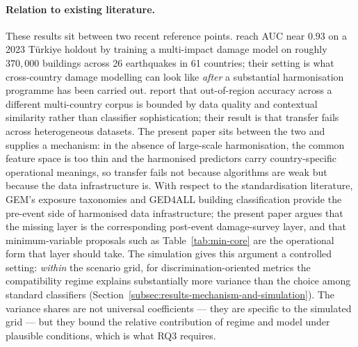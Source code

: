 \documentclass[11pt,a4paper]{article}
\begin{document}
\paragraph{Relation to existing literature.} These results sit between two recent reference points. \citet{patten2024datadriven} reach AUC near $0.93$ on a 2023 T\"urkiye holdout by training a multi-impact damage model on roughly $370{,}000$ buildings across 26 earthquakes in 61 countries; their setting is what cross-country damage modelling can look like \emph{after} a substantial harmonisation programme has been carried out. \citet{ghimire2024host} report that out-of-region accuracy across a different multi-country corpus is bounded by data quality and contextual similarity rather than classifier sophistication; their result is that transfer fails across heterogeneous datasets. The present paper sits between the two and supplies a mechanism: in the absence of large-scale harmonisation, the common feature space is too thin and the harmonised predictors carry country-specific operational meanings, so transfer fails not because algorithms are weak but because the data infrastructure is. With respect to the standardisation literature, GEM's exposure taxonomies and GED4ALL building classification \citep{silva2022buildingclass, yepes2023exposure} provide the pre-event side of harmonised data infrastructure; the present paper argues that the missing layer is the corresponding post-event damage-survey layer, and that minimum-variable proposals such as Table~\ref{tab:min-core} are the operational form that layer should take. The simulation gives this argument a controlled setting: \emph{within} the scenario grid, for discrimination-oriented metrics the compatibility regime explains substantially more variance than the choice among standard classifiers (Section~\ref{subsec:results-mechanism-and-simulation}). The variance shares are not universal coefficients --- they are specific to the simulated grid --- but they bound the relative contribution of regime and model under plausible conditions, which is what RQ3 requires.
\end{document}
